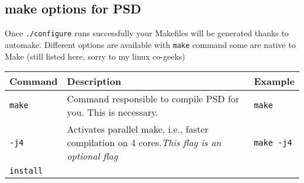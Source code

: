 \subsection{make options for PSD}

Once \lstinline!./configure! runs successfully your Makefiles will be
generated thanks to automake. Different options are available with
\lstinline!make! command some are native to Make (still listed here,
sorry to my linux co-geeks)


\begin{longtable}[]{@{}lll@{}}
\toprule
\begin{minipage}[b]{0.15\columnwidth}\raggedright\strut
\textbf{Command}\strut
\end{minipage} & \begin{minipage}[b]{0.47\columnwidth}\raggedright\strut
\textbf{Description}\strut
\end{minipage} & \begin{minipage}[b]{0.30\columnwidth}\raggedright\strut
\textbf{Example}\strut
\end{minipage}\tabularnewline
\midrule
\endhead
\begin{minipage}[t]{0.15\columnwidth}\raggedright\strut
\lstinline!make!\strut
\end{minipage} & \begin{minipage}[t]{0.47\columnwidth}\raggedright\strut
Command responsible to compile PSD for you. This is necessary.\strut
\end{minipage} & \begin{minipage}[t]{0.30\columnwidth}\raggedright\strut
\lstinline!make!\strut
\end{minipage}\tabularnewline
\begin{minipage}[t]{0.15\columnwidth}\raggedright\strut
\lstinline!-j4!\strut
\end{minipage} & \begin{minipage}[t]{0.47\columnwidth}\raggedright\strut
Activates parallel make, i.e., faster compilation on 4 cores.\emph{This
flag is an optional flag}\strut
\end{minipage} & \begin{minipage}[t]{0.30\columnwidth}\raggedright\strut
\lstinline!make -j4!\strut
\end{minipage}\tabularnewline
\begin{minipage}[t]{0.15\columnwidth}\raggedright\strut
\lstinline!install!\strut
\end{minipage} & \begin{minipage}[t]{0.47\columnwidth}\raggedright\strut

\end{minipage}
\end{longtable}

